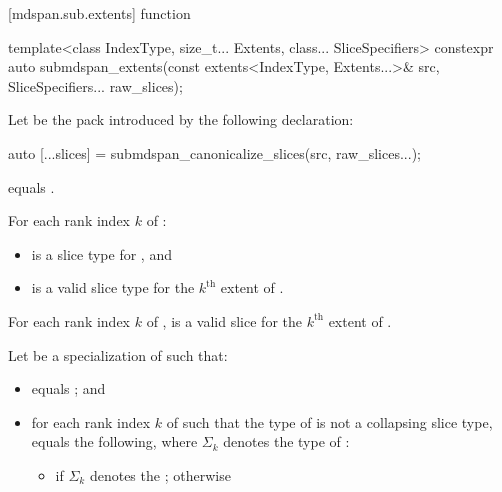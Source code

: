 [mdspan.sub.extents]{ function}

%
\begin{itemdecl}
template<class IndexType, size_t... Extents, class... SliceSpecifiers>
  constexpr auto submdspan_extents(const extents<IndexType, Extents...>& src,
                                   SliceSpecifiers... raw_slices);
\end{itemdecl}

\begin{itemdescr}
\pnum
Let  be the pack introduced by the following declaration:
\begin{codeblock}
auto [...slices] = submdspan_canonicalize_slices(src, raw_slices...);
\end{codeblock}

\pnum
\constraints
{} equals .

\pnum
\mandates
For each rank index $k$ of :
\begin{itemize}
\item
  is a  slice type for , and
\item
   is a valid  slice type
  for the $k^\text{th}$ extent of .
\end{itemize}

\pnum
\expects
For each rank index $k$ of ,
 is a valid  slice
for the $k^\text{th}$ extent of .

\pnum
Let  be a specialization of  such that:

\begin{itemize}
\item
{} equals
; and

\item
for each rank index $k$ of  such that
the type of  is not a collapsing slice type,
equals the following, where $\Sigma_k$
denotes the type of :

  \begin{itemize}
  \item
  if $\Sigma_k$ denotes the ;
  otherwise


\end{itemize}
\end{itemize}
\end{itemdescr}
